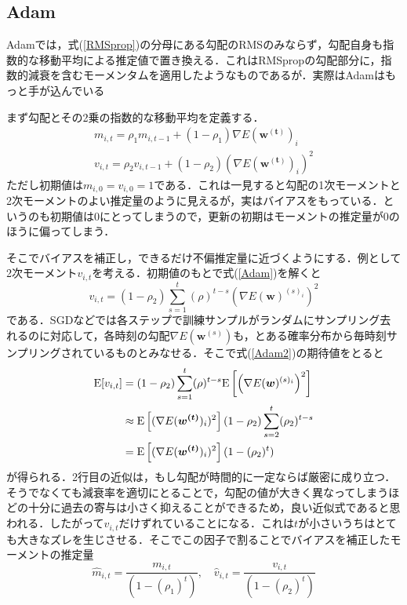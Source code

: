 \documentclass[a4paper,11pt]{jsreport}
\begin{document}
\subsection{Adam}
Adamでは，式(\ref{RMSprop})の分母にある勾配のRMSのみならず，勾配自身も指数的な移動平均による推定値で置き換える．これはRMSpropの勾配部分に，指数的減衰を含むモーメンタムを適用したようなものであるが．実際はAdamはもっと手が込んでいる\par
まず勾配とその2乗の指数的な移動平均を定義する．
\begin{align}
  m_{i,t} = \rho_1 m_{i,t-1} + (1 - \rho_1) \nabla E(\bm{w^{(t)}})_i \\
  v_{i,t} = \rho_2 v_{i,t-1} + (1 - \rho_2) \left(\nabla E(\bm{w^{(t)}})_i\right)^2 \label{Adam}
\end{align}
ただし初期値は$m_{i,0}=v_{i,0}=1$である．これは一見すると勾配の1次モーメントと2次モーメントのよい推定量のように見えるが，実はバイアスをもっている．というのも初期値は0にとってしまうので，更新の初期はモーメントの推定量が0のほうに偏ってしまう．\par
そこでバイアスを補正し，できるだけ不偏推定量に近づくようにする．例として2次モーメント$v_{i,t}$を考える．初期値のもとで式(\ref{Adam})を解くと
\begin{equation}
  v_{i,t} = (1 - \rho_2)\sum_{s=1}^t (\rho)^{t-s} \left(\nabla E(\bm{w})^{(s)_i}\right)^2 \label{Adam2}
\end{equation}
である．SGDなどでは各ステップで訓練サンプルがランダムにサンプリング去れるのに対応して，各時刻の勾配$\nabla E(\bm{w}^{(s)})$も，とある確率分布から毎時刻サンプリングされているものとみなせる．そこで式(\ref{Adam2})の期待値をとると
\begin{align}
  \mathrm{E}[v_{i,t}]
  &= (1-\rho_2)\sum_{s=1}^t (\rho)^{t-s} \mathrm{E}\left[\left(\nabla E(\bm{w})^{(s)_i}\right)^2\right] \notag \\
  &\approx \mathrm{E}\left[(\nabla E(\bm{w^{(t)}})_i)^2 \right] (1 - \rho_2) \sum_{s=2}^t (\rho_2)^{t-s} \notag \\
  &= \mathrm{E}\left[(\nabla E(\bm{w^{(t)}})_i)^2 \right] (1 - (\rho_2)^t)
\end{align}
が得られる．2行目の近似は，もし勾配が時間的に一定ならば厳密に成り立つ．そうでなくても減衰率を適切にとることで，勾配の値が大きく異なってしまうほどの十分に過去の寄与は小さく抑えることができるため，良い近似式であると思われる．したがって$v_{i,t}$だけずれていることになる．これは$t$が小さいうちはとても大きなズレを生じさせる．そこでこの因子で割ることでバイアスを補正したモーメントの推定量
\begin{equation}
  \hat{m}_{i,t} = \frac{m_{i,t}}{(1 - (\rho_1)^t)}, \quad \hat{v}_{i,t} = \frac{v_{i,t}}{(1 - (\rho_2)^t)}
\end{equation}
\end{document}
